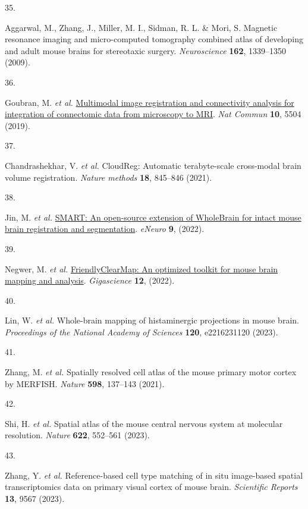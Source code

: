 \documentclass[
  12pt,
]{article}
\newlength{\cslhangindent}
\newlength{\csllabelwidth}
\newenvironment{CSLReferences}[2] %
 {\begin{list}{}{%
  \setlength{\itemindent}{0pt}
  \setlength{\leftmargin}{0pt}
  \setlength{\parsep}{0pt}
  \ifodd #1
   \setlength{\leftmargin}{\cslhangindent}
   \setlength{\itemindent}{-1\cslhangindent}
  \fi
  \setlength{\itemsep}{#2\baselineskip}}}
 {\end{list}}
\newcommand{\CSLLeftMargin}[1]{\parbox[t]{\csllabelwidth}{\strut#1\strut}}
\newcommand{\CSLRightInline}[1]{\parbox[t]{\linewidth - \csllabelwidth}{\strut#1\strut}}
\begin{document}
\begin{CSLReferences}{0}{0}
\CSLLeftMargin{35. }%
\CSLRightInline{Aggarwal, M., Zhang, J., Miller, M. I., Sidman, R. L. \&
Mori, S. Magnetic resonance imaging and micro-computed tomography
combined atlas of developing and adult mouse brains for stereotaxic
surgery. \emph{Neuroscience} \textbf{162}, 1339--1350 (2009).}

\CSLLeftMargin{36. }%
\CSLRightInline{Goubran, M. \emph{et al.}
\href{https://doi.org/10.1038/s41467-019-13374-0}{Multimodal image
registration and connectivity analysis for integration of connectomic
data from microscopy to MRI}. \emph{Nat Commun} \textbf{10}, 5504
(2019).}

\CSLLeftMargin{37. }%
\CSLRightInline{Chandrashekhar, V. \emph{et al.} CloudReg: Automatic
terabyte-scale cross-modal brain volume registration. \emph{Nature
methods} \textbf{18}, 845--846 (2021).}

\CSLLeftMargin{38. }%
\CSLRightInline{Jin, M. \emph{et al.}
\href{https://doi.org/10.1523/ENEURO.0482-21.2022}{SMART: An open-source
extension of WholeBrain for intact mouse brain registration and
segmentation}. \emph{eNeuro} \textbf{9}, (2022).}

\CSLLeftMargin{39. }%
\CSLRightInline{Negwer, M. \emph{et al.}
\href{https://doi.org/10.1093/gigascience/giad035}{FriendlyClearMap: An
optimized toolkit for mouse brain mapping and analysis}.
\emph{Gigascience} \textbf{12}, (2022).}

\CSLLeftMargin{40. }%
\CSLRightInline{Lin, W. \emph{et al.} Whole-brain mapping of
histaminergic projections in mouse brain. \emph{Proceedings of the
National Academy of Sciences} \textbf{120}, e2216231120 (2023).}

\CSLLeftMargin{41. }%
\CSLRightInline{Zhang, M. \emph{et al.} Spatially resolved cell atlas of
the mouse primary motor cortex by MERFISH. \emph{Nature} \textbf{598},
137--143 (2021).}

\CSLLeftMargin{42. }%
\CSLRightInline{Shi, H. \emph{et al.} Spatial atlas of the mouse central
nervous system at molecular resolution. \emph{Nature} \textbf{622},
552--561 (2023).}

\CSLLeftMargin{43. }%
\CSLRightInline{Zhang, Y. \emph{et al.} Reference-based cell type
matching of in situ image-based spatial transcriptomics data on primary
visual cortex of mouse brain. \emph{Scientific Reports} \textbf{13},
9567 (2023).}


\end{CSLReferences}
\end{document}
